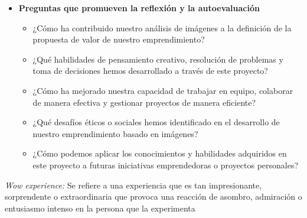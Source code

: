 \begin{itemize}
\begin{itemize}
    \end{itemize}
    \item \textbf{Preguntas que promueven la reflexión y la autoevaluación}
    \begin{itemize}
        \item ¿Cómo ha contribuido nuestro análisis de imágenes a la definición de la propuesta de valor de nuestro emprendimiento?
        \item ¿Qué habilidades de pensamiento creativo, resolución de problemas y toma de decisiones hemos desarrollado a través de este proyecto?
        \item ¿Cómo ha mejorado nuestra capacidad de trabajar en equipo, colaborar de manera efectiva y gestionar proyectos de manera eficiente?
        \item ¿Qué desafíos éticos o sociales hemos identificado en el desarrollo de nuestro emprendimiento basado en imágenes?
        \item ¿Cómo podemos aplicar los conocimientos y habilidades adquiridos en este proyecto a futuras iniciativas emprendedoras o proyectos personales?
    \end{itemize}
\end{itemize}
\textit{Wow experience:} Se refiere a una experiencia que es tan impresionante, sorprendente o extraordinaria que provoca una reacción de asombro, admiración o entusiasmo intenso en la persona que la experimenta

